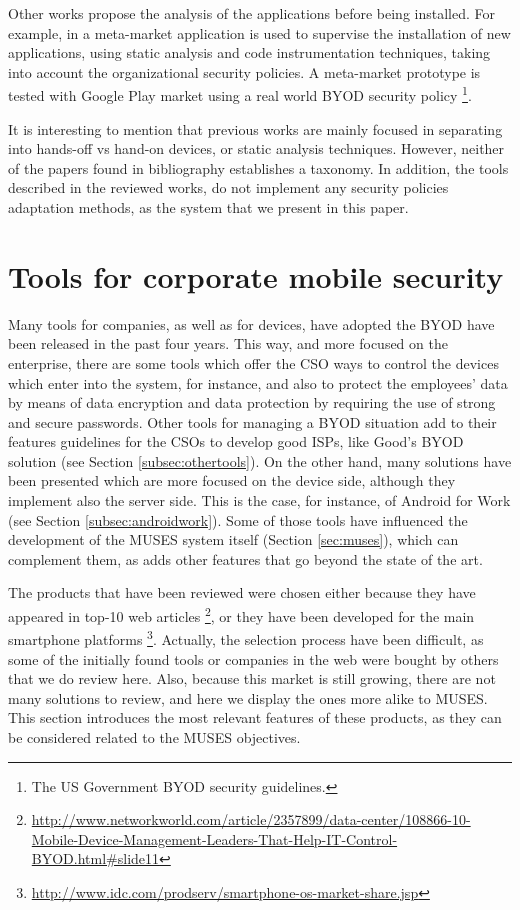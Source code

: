 Other works propose the analysis of the applications before being installed. For example, in \cite{Armando14metamarket} a meta-market application is used to supervise the installation of new applications, using static analysis and code instrumentation techniques, taking into account the organizational security policies. A meta-market prototype is tested with Google Play market using a real world BYOD security policy \footnote{The US Government BYOD security guidelines.}.


It is interesting to mention that previous works are mainly focused in separating into hands-off vs hand-on devices, or static analysis techniques. However, neither of the papers found in bibliography establishes a taxonomy. In addition, the tools described in the reviewed works, do not implement any security policies adaptation methods, as the system that we present in this paper.

\section{Tools for corporate mobile security}
\label{sec:toolsreview}

Many tools for companies, as well as for devices, have adopted the BYOD have been released in the past four years. This way, and
more focused on the enterprise, there are some tools which offer the CSO ways to control the devices which enter into the system, for instance, and also to protect the employees' data by means of data encryption and data protection by requiring the use of strong and secure passwords. Other tools for managing a BYOD situation add to their features guidelines for the CSOs to develop good ISPs, like Good's BYOD solution (see Section \ref{subsec:othertools}). On the other hand, many solutions have been presented which are more focused on the device side, although they implement also the server side. This is the case, for instance, of Android for Work (see Section \ref{subsec:androidwork}). Some of those tools have influenced the development of the MUSES system  itself (Section \ref{sec:muses}), which can complement them, as adds other features that go beyond the state of the art. 

The products that have been reviewed were chosen either because they have appeared in top-10 web articles \footnote{\url{http://www.networkworld.com/article/2357899/data-center/108866-10-Mobile-Device-Management-Leaders-That-Help-IT-Control-BYOD.html#slide11}}, or they have been developed for the main smartphone platforms \footnote{\url{http://www.idc.com/prodserv/smartphone-os-market-share.jsp}}. Actually, the selection process have been difficult, as some of the initially found tools or companies in the web were bought by others that we do review here. Also, because this market is still growing, there are not many solutions to review, and here we display the ones more alike to MUSES. This section introduces the most relevant features of these products, as they can be considered related to the MUSES objectives.

